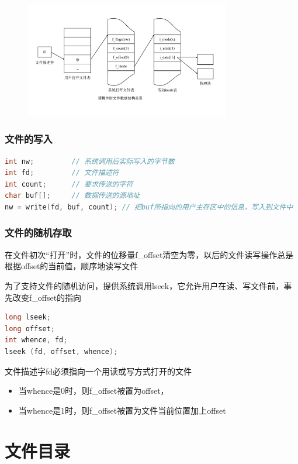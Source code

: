 \documentclass[cs4size,a4paper,10pt]{ctexart}
\begin{document}
	\begin{figure}[H]
		\centering
		\includegraphics[width=0.8\textwidth]{img/读操作时文件数据结构关系}
	\end{figure}


	\subsubsection{文件的写入}
	\begin{lstlisting}[language=C,keywordstyle=\color{black}]
int nw;     	// 系统调用后实际写入的字节数
int fd;     	// 文件描述符
int count;  	// 要求传送的字符
char buf[];	 	// 数据传送的源地址
nw = write(fd, buf, count); // 把buf所指向的用户主存区中的信息，写入到文件中
	\end{lstlisting}


	\subsubsection{文件的随机存取}
	在文件初次“打开”时，文件的位移量f\_offset清空为零，以后的文件读写操作总是根据offset的当前值，顺序地读写文件

	为了支持文件的随机访问，提供系统调用lseek，它允许用户在读、写文件前，事先改变f\_offset的指向
	\begin{lstlisting}[language=C,keywordstyle=\color{black}]
long lseek;
long offset;
int whence, fd;
lseek (fd, offset, whence);		
	\end{lstlisting}
	文件描述字fd必须指向一个用读或写方式打开的文件
	\begin{itemize}
		\item 当whence是0时，则f\_offset被置为offset，
		\item 当whence是1时，则f\_offset被置为文件当前位置加上offset
	\end{itemize}


	\section{文件目录}
\end{document}

